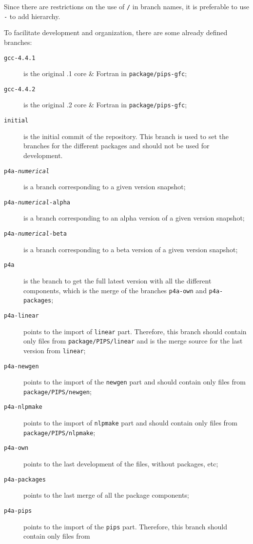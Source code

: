 \documentclass[a4paper]{article}
\begin{document}
Since there are restrictions on the use of \texttt{/} in branch names,
it is preferable to use \texttt{-} to add hierarchy.

To facilitate development and organization, there are some already
defined branches:
\begin{description}
\item[\texttt{gcc-4.4.1}] is the original .1 core \& Fortran in
  \texttt{package/pips-gfc};
\item[\texttt{gcc-4.4.2}] is the original .2 core \& Fortran in
  \texttt{package/pips-gfc};
\item[\texttt{initial}] is the initial commit of the \Apfa
  repository. This branch is used
  to set the branches for the different packages and should not
  be used for development.
\item[\texttt{p4a-\emph{numerical}}] is a branch corresponding to a
  given version snapshot;
\item[\texttt{p4a-\emph{numerical}-alpha}] is a branch corresponding
  to an alpha version of a given version snapshot;
\item[\texttt{p4a-\emph{numerical}-beta}] is a branch corresponding to a beta
  version of a given version snapshot;
\item[\texttt{p4a}] is the branch to get the full latest \Apfa version
  with all the different components, which is the merge of the branches
  \texttt{p4a-own} and \texttt{p4a-packages};
\item[\texttt{p4a-linear}] points to the import of \Apips \texttt{linear}
  part. Therefore, this branch should contain only files from
  \texttt{package/PIPS/linear} and is the merge source for
  the last version from \texttt{linear};
\item[\texttt{p4a-newgen}] points to the import of the \Apips \texttt{newgen}
  part and should contain only files from
  \texttt{package/PIPS/newgen};
\item[\texttt{p4a-nlpmake}] points to the import of \Apips \texttt{nlpmake}
  part and should contain only files from
  \texttt{package/PIPS/nlpmake};
\item[\texttt{p4a-own}] points to the last development of the \Apfa files,
  without packages, etc;
\item[\texttt{p4a-packages}] points to the last merge of all the \Apfa
  package components;
\item[\texttt{p4a-pips}] points to the import of the \Apips \texttt{pips}
  part. Therefore, this branch should contain only files from

\end{description}
\end{document}
